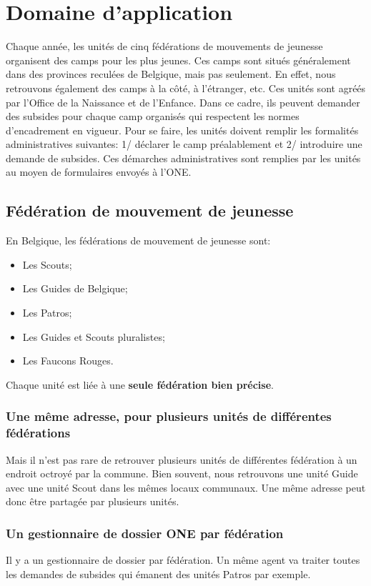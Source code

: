 \section{Domaine d'application}
	Chaque année, les unités de cinq fédérations de mouvements de jeunesse organisent des camps pour les plus jeunes. Ces camps sont situés généralement dans des provinces reculées de Belgique, mais pas seulement. En effet, nous retrouvons également des camps à la côté, à l'étranger, etc. 
	Ces unités sont agréés par l'Office de la Naissance et de l'Enfance. Dans ce cadre, ils peuvent demander des subsides pour chaque camp organisés qui respectent les normes d'encadrement en vigueur. Pour se faire, les unités doivent remplir les formalités administratives suivantes: 1/ déclarer le camp préalablement et 2/ introduire une demande de subsides. Ces démarches administratives sont remplies par les unités au moyen de formulaires envoyés à l'ONE. 


\subsection{Fédération de mouvement de jeunesse}\label{fmj}
En Belgique, les fédérations de mouvement de jeunesse sont: \begin{itemize}
	    \item Les Scouts;
	    \item Les Guides de Belgique;
	    \item Les Patros;
	    \item Les Guides et Scouts pluralistes;
	    \item Les Faucons Rouges.
	\end{itemize}
Chaque unité est liée à une \textbf{seule fédération bien précise}. 


\subsubsection{Une même adresse, pour plusieurs unités de différentes fédérations}
Mais il n'est pas rare de retrouver plusieurs unités de différentes fédération à un endroit octroyé par la commune. Bien souvent, nous retrouvons une unité Guide avec une unité Scout dans les mêmes locaux communaux. Une même adresse peut donc être partagée par plusieurs unités.

\subsubsection{Un gestionnaire de dossier ONE par fédération}
Il y a un gestionnaire de dossier par fédération. Un même agent va traiter toutes les demandes de subsides qui émanent des unités Patros par exemple.



